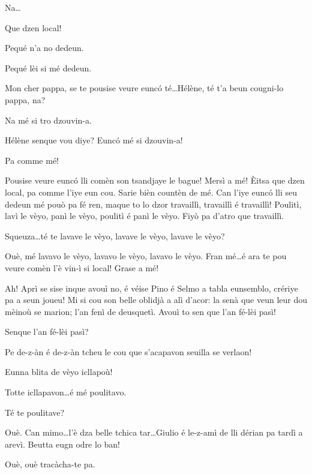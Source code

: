 \begin{drama}
\Helenespeaks Na\ldots

\Bertaspeaks{} \og Que dzen local\fg!

\Helenespeaks{} Pequé n'a no dedeun.

\Bertaspeaks{} Pequé lèi si mé dedeun.


\Bertaspeaks Mon cher pappa, se te pousise veure eunc\'o té\ldots Hélène, té t'a beun cougni-lo pappa, na?

\Helenespeaks Na mé si tro dzouvin-a.

\Bertaspeaks Hélène senque vou diye? Eunc\'o mé si dzouvin-a!

\Helenespeaks Pa comme mé!

\Bertaspeaks{} Pousise veure eunc\'o lli comèn son tsandjaye le bague! Mersì a mé! \`Eitsa que dzen local, pa comme l'iye eun cou. Sarie bièn countèn de mé. Can l'iye eunc\'o lli seu dedeun mé pouò pa fé ren, maque to lo dzor travaillì, travaillì é travaillì! Poulitì, lavì le vèyo, panì le vèyo, poulitì é panì le vèyo. Fiyò pa d'atro que travaillì.

\Helenespeaks{} Squeuza\ldots té te lavave le vèyo, lavave le vèyo, lavave le vèyo?

\Bertaspeaks Ouè, mé lavavo le vèyo, lavavo le vèyo, lavavo le vèyo. Fran mé\ldots é ara te pou veure comèn l'è vin-ì si local! Grase a mé!

\Bertaspeaks Ah! Aprì se sise inque avouì no, é véise Pino é Selmo a tabla eunsemblo, crériye pa a seun joueu! Mi si cou son belle oblidjà a alì d'acor: la senà que veun leur dou mèinoù se marion; l'an fenì de deusquetì. Avouì to sen que l'an fé-lèi pasì!

\Helenespeaks Senque l'an fé-lèi pasì?

\Bertaspeaks Pe de-z-àn é de-z-àn tcheu le cou que s'acapavon seuilla se verlaon!

\Dorinaspeaks Eunna blita de vèyo icllapoù!

\Bertaspeaks Totte icllapavon\ldots é mé poulitavo.

\Helenespeaks Té te poulitave?

\Bertaspeaks Ouè. Can mimo\ldots l'è dza belle tchica tar\ldots Giulio é le-z-amì de lli dérian pa tardì a arevì. Beutta eugn odre lo ban!

\Helenespeaks Ouè, ouè tracàcha-te pa.


\end{drama}
